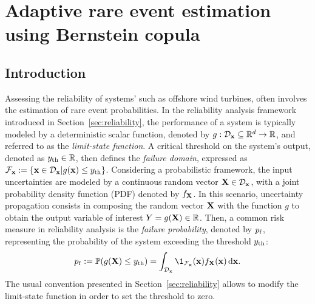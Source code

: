 \cleardoublepage
\chapter{Adaptive rare event estimation using Bernstein copula}
\label{chpt:6}
\hfill
\localtableofcontents
\newpage

\section{Introduction}

Assessing the reliability of systems' such as offshore wind turbines, often involves the estimation of rare event probabilities. 
In the reliability analysis framework introduced in Section~\ref{sec:reliability}, the performance of a system is typically modeled by a deterministic scalar function, denoted by $g: \mathcal{D}_{\bf x} \subseteq \mathbb{R}^d \rightarrow \mathbb{R}$, and referred to as the \textit{limit-state function}. 
A critical threshold on the system's output, denoted as $y_\mathrm{th} \in \mathbb{R}$, then defines the \textit{failure domain}, expressed as $\mathcal{F}_{{\bf x}} := \{{\bf x} \in \mathcal{D}_{\bf x} | g({\bf x}) \leq y_\mathrm{th}\}$. 
Considering a probabilistic framework, the input uncertainties are modeled by a continuous random vector ${\bf X} \in \mathcal{D}_{\bf x}$, with a joint probability density function (PDF) denoted by $f_{\bf X}$. 
In this scenario, uncertainty propagation consists in composing the random vector ${\bf X}$ with the function $g$ to obtain the output variable of interest $Y = g({\bf X}) \in \mathbb{R}$. 
Then, a common risk measure in reliability analysis is the \textit{failure probability}, denoted by $p_\mathrm{f}$, representing the probability of the system exceeding the threshold $y_\mathrm{th}$:
\begin{equation}
    \label{eq:failure_proba_c6}
    \pf := \P(g(\bX) \leq \yth)
        = \int_{\iD_\bx} \1_{\iF_\bx}(\bx) f_\bX(\bx) \, \dd\bx.
\end{equation}
The usual convention presented in Section~\ref{sec:reliability} allows to modify the limit-state function in order to set the threshold to zero. 

